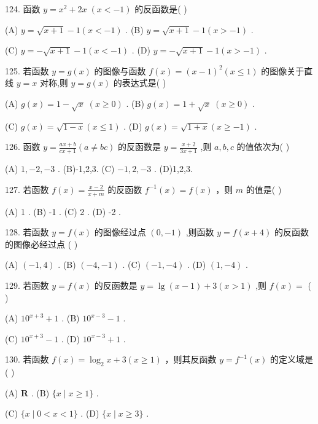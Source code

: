 \documentclass[10pt]{article}
\begin{document}
124. 函数 \(y = {x}^{2} + {2x}\;\left( {x <  - 1}\right)\) 的反函数是( )

(A) \(y = \sqrt{x + 1} - 1\left( {x <  - 1}\right)\) . (B) \(y = \sqrt{x + 1} - 1\left( {x >  - 1}\right)\) .

(C) \(y =  - \sqrt{x + 1} - 1\left( {x <  - 1}\right)\) . (D) \(y =  - \sqrt{x + 1} - 1\left( {x >  - 1}\right)\) .

125. 若函数 \(y = g\left( x\right)\) 的图像与函数 \(f\left( x\right)  = {\left( x - 1\right) }^{2}\left( {x \leq  1}\right)\) 的图像关于直线 \(y = x\) 对称,则 \(y = g\left( x\right)\) 的表达式是( )

(A) \(g\left( x\right)  = 1 - \sqrt{x}\;\left( {x \geq  0}\right)\) . (B) \(g\left( x\right)  = 1 + \sqrt{x}\;\left( {x \geq  0}\right)\) .

(C) \(g\left( x\right)  = \sqrt{1 - x}\left( {x \leq  1}\right)\) . (D) \(g\left( x\right)  = \sqrt{1 + x}\left( {x \geq   - 1}\right)\) .

126. 函数 \(y = \frac{{ax} + b}{{cx} + 1}\left( {a \neq  {bc}}\right)\) 的反函数是 \(y = \frac{x + 2}{{3x} + 1}\) ,则 \(a,b,c\) 的值依次为( )

(A) \(1, - 2, - 3\) . (B)-1,2,3. (C) \(- 1,2, - 3\) . (D)1,2,3.

127. 若函数 \(f\left( x\right)  = \frac{x - 2}{x + m}\) 的反函数 \({f}^{-1}\left( x\right)  = f\left( x\right)\) ，则 \(m\) 的值是( )

(A) 1 . (B) -1 . (C) 2 . (D) -2 .

128. 若函数 \(y = f\left( x\right)\) 的图像经过点 \(\left( {0, - 1}\right)\) ,则函数 \(y = f\left( {x + 4}\right)\) 的反函数的图像必经过点 ( )

(A) \(\left( {-1,4}\right)\) . (B) \(\left( {-4, - 1}\right)\) . (C) \(\left( {-1, - 4}\right)\) . (D) \(\left( {1, - 4}\right)\) .

129. 若函数 \(y = f\left( x\right)\) 的反函数是 \(y = \lg \left( {x - 1}\right)  + 3\left( {x > 1}\right)\) ,则 \(f\left( x\right)  =\) (   )

(A) \({10}^{x + 3} + 1\) . (B) \({10}^{x - 3} - 1\) .

(C) \({10}^{x + 3} - 1\) . (D) \({10}^{x - 3} + 1\) .

130. 若函数 \(f\left( x\right)  = {\log }_{2}x + 3\left( {x \geq  1}\right)\) ，则其反函数 \(y = {f}^{-1}\left( x\right)\) 的定义域是( )

(A) \(\mathbf{R}\) . (B) \(\{ x \mid  x \geq  1\}\) .

(C) \(\{ x \mid  0 < x < 1\}\) . (D) \(\{ x \mid  x \geq  3\}\) .
\end{document}
